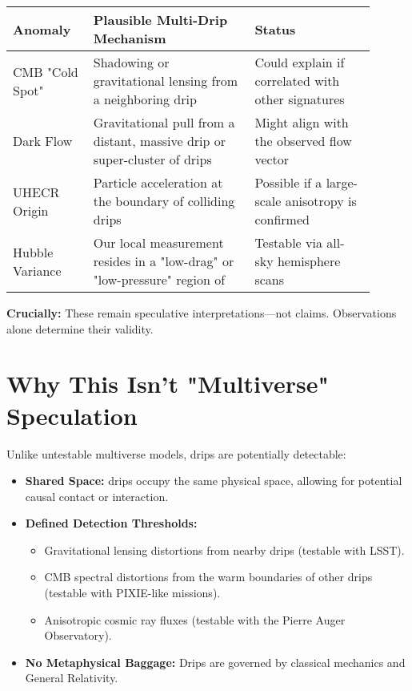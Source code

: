 \documentclass{BSpacePaper} %
\begin{document}
\begin{center}
    \captionsetup{type=table}
    \label{tab:multi_drip_anomalies}
    \begin{tabular}{@{}>{\raggedright}p{0.2\linewidth} >{\raggedright}p{0.4\linewidth} >{\raggedright\arraybackslash}p{0.3\linewidth}@{}}
    \toprule
    \textbf{Anomaly} & \textbf{Plausible Multi-Drip Mechanism} & \textbf{Status} \\
    \midrule
    CMB "Cold Spot" & Shadowing or gravitational lensing from a neighboring drip & Could explain if correlated with other signatures \\
    \addlinespace
    Dark Flow & Gravitational pull from a distant, massive drip or super-cluster of drips & Might align with the observed flow vector \\
    \addlinespace
    UHECR Origin & Particle acceleration at the boundary of colliding drips & Possible if a large-scale anisotropy is confirmed \\
    \addlinespace
    Hubble Variance & Our local measurement resides in a "low-drag" or "low-pressure" region of \bspace{} & Testable via all-sky hemisphere scans \\
    \bottomrule
    \end{tabular}
\end{center}
\noindent \textbf{Crucially:} These remain speculative interpretations—not claims. Observations alone determine their validity.

\section{Why This Isn't "Multiverse" Speculation}
Unlike untestable multiverse models, \bspace{} drips are potentially detectable:
\begin{itemize}
    \item \textbf{Shared Space:} \bspace{} drips occupy the same physical space, allowing for potential causal contact or interaction.
    \item \textbf{Defined Detection Thresholds:}
    \begin{itemize}
        \item Gravitational lensing distortions from nearby drips (testable with LSST).
        \item CMB spectral distortions from the warm boundaries of other drips (testable with PIXIE-like missions).
        \item Anisotropic cosmic ray fluxes (testable with the Pierre Auger Observatory).
    \end{itemize}
    \item \textbf{No Metaphysical Baggage:} Drips are governed by classical mechanics and General Relativity.
\end{itemize}
\end{document}
